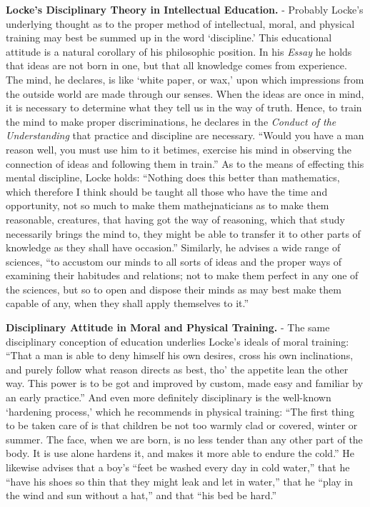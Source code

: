\documentclass[]{book}
\begin{document}
\textbf{Locke's Disciplinary Theory in Intellectual Education.} - Probably Locke's underlying thought as to the proper method of intellectual, moral, and physical training may best be summed up in the word `discipline.' This educational attitude is a natural corollary of his philosophic position. In his \emph{Essay} he holds that ideas are not born in one, but that all knowledge comes from experience. The mind, he declares, is like `white paper, or wax,' upon which impressions from the outside world are made through our senses. When the ideas are once in mind, it is necessary to determine what they tell us in the way of truth. Hence, to train the mind to make proper discriminations, he declares in the \emph{Conduct of the Understanding} that practice and discipline are necessary. ``Would you have a man reason well, you must use him to it betimes, exercise his mind in observing the connection of ideas and following them in train.'' As to the means of effecting this mental discipline, Locke holds: ``Nothing does this better than mathematics, which therefore I think should be taught all those who have the time and opportunity, not so much to make them mathejnaticians as to make them reasonable, creatures, that having got the way of reasoning, which that study necessarily brings the mind to, they might be able to transfer it to other parts of knowledge as they shall have occasion.'' Similarly, he advises a wide range of sciences, ``to accustom our minds to all sorts of ideas and the proper ways of examining their habitudes and relations; not to make them perfect in any one of the sciences, but so to open and dispose their minds as may best make them capable of any, when they shall apply themselves to it.''

\textbf{Disciplinary Attitude in Moral and Physical Training.} - The same disciplinary conception of education underlies Locke's ideals of moral training: ``That a man is able to deny himself his own desires, cross his own inclinations, and purely follow what reason directs as best, tho' the appetite lean the other way. This power is to be got and improved by custom, made easy and familiar by an early practice.'' And even more definitely disciplinary is the well-known `hardening process,' which he recommends in physical training: ``The first thing to be taken care of is that children be not too warmly clad or covered, winter or summer. The face, when we are born, is no less tender than any other part of the body. It is use alone hardens it, and makes it more able to endure the cold.'' He likewise advises that a boy's ``feet be washed every day in cold water,'' that he ``have his shoes so thin that they might leak and let in water,'' that he ``play in the wind and sun without a hat,'' and that ``his bed be hard.''
\end{document}
